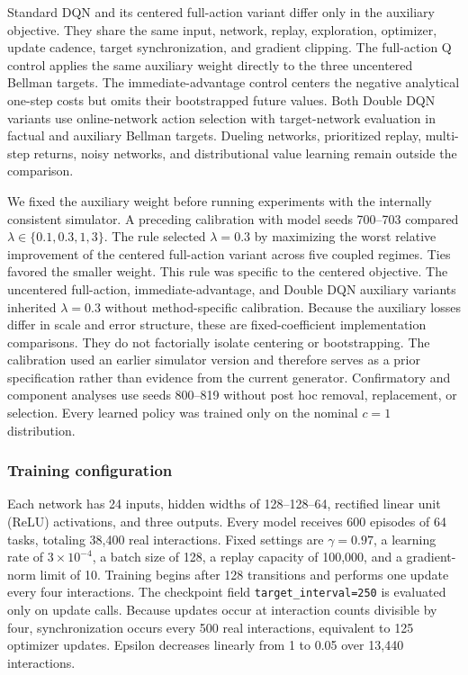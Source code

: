 \documentclass[remotesensing,article,submit,moreauthors]{Definitions/mdpi}
\begin{document}
Standard DQN and its centered full-action variant differ only in the auxiliary objective. They share the same input, network, replay, exploration, optimizer, update cadence, target synchronization, and gradient clipping. The full-action Q control applies the same auxiliary weight directly to the three uncentered Bellman targets. The immediate-advantage control centers the negative analytical one-step costs but omits their bootstrapped future values. Both Double DQN variants use online-network action selection with target-network evaluation in factual and auxiliary Bellman targets. Dueling networks, prioritized replay, multi-step returns, noisy networks, and distributional value learning remain outside the comparison.

We fixed the auxiliary weight before running experiments with the internally consistent simulator. A preceding calibration with model seeds 700--703 compared $\lambda\in\{0.1,0.3,1,3\}$. The rule selected $\lambda=0.3$ by maximizing the worst relative improvement of the centered full-action variant across five coupled regimes. Ties favored the smaller weight. This rule was specific to the centered objective. The uncentered full-action, immediate-advantage, and Double DQN auxiliary variants inherited $\lambda=0.3$ without method-specific calibration. Because the auxiliary losses differ in scale and error structure, these are fixed-coefficient implementation comparisons. They do not factorially isolate centering or bootstrapping. The calibration used an earlier simulator version and therefore serves as a prior specification rather than evidence from the current generator. Confirmatory and component analyses use seeds 800--819 without post hoc removal, replacement, or selection. Every learned policy was trained only on the nominal $c=1$ distribution.

\subsubsection{Training configuration}

Each network has 24 inputs, hidden widths of 128--128--64, rectified linear unit (ReLU) activations, and three outputs. Every model receives 600 episodes of 64 tasks, totaling 38,400 real interactions. Fixed settings are $\gamma=0.97$, a learning rate of $3\times10^{-4}$, a batch size of 128, a replay capacity of 100,000, and a gradient-norm limit of 10. Training begins after 128 transitions and performs one update every four interactions. The checkpoint field \texttt{target\_interval=250} is evaluated only on update calls. Because updates occur at interaction counts divisible by four, synchronization occurs every 500 real interactions, equivalent to 125 optimizer updates. Epsilon decreases linearly from 1 to 0.05 over 13,440 interactions.
\end{document}
